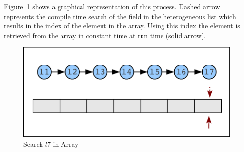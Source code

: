 \documentclass[natbib]{sigplanconf}
\newcommand{\Varid}[1]{\mathit{#1}}
\begin{document}
Figure~\ref{fig:search-array} shows a graphical representation of this process. 
Dashed arrow represents the compile time search of the field in the heterogeneous list which results in the index of the element in the array. Using this index the element is retrieved from the array in constant time at run time (solid arrow).

\begin{figure}[t]
\begin{center}
\includegraphics[scale=0.5]{search-array.pdf}
\end{center}
\caption{Search \ensuremath{\Varid{l7}} in Array} \label{fig:search-array}
\end{figure}
\end{document}
